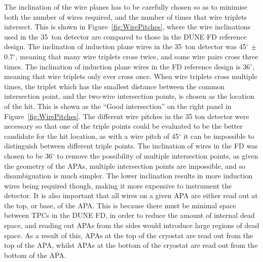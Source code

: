 The inclination of the wire planes has to be carefully chosen so as to minimise both the number of wires required, and the number of times that wire triplets intersect. This is shown in Figure~\ref{fig:WirePitches}, where the wire inclinations used in the 35~ton detector are compared to those in the DUNE FD reference design. The inclination of induction plane wires in the 35~ton detector was 45$^{\circ}$ $\pm$ 0.7$^{\circ}$, meaning that many wire triplets cross twice, and some wire pairs cross three times. The inclination of induction plane wires in the FD reference design is 36$^{\circ}$, meaning that wire triplets only ever cross once. When wire triplets cross multiple times, the triplet which has the smallest distance between the common intersection point, and the two-wire intersection points, is chosen as the location of the hit. This is shown as the ``Good intersection'' on the right panel in Figure~\ref{fig:WirePitches}. The different wire pitches in the 35 ton detector were necessary so that one of the triple points could be evaluated to be the better candidate for the hit location, as with a wire pitch of 45$^{\circ}$ it can be impossible to distinguish between different triple points. The inclination of wires in the FD was chosen to be 36$^{\circ}$ to remove the possibility of multiple intersection points, as given the geometry of the APAs, multiple intersection points are impossible, and so disambiguation is much simpler. The lower inclination results in more induction wires being required though, making it more expensive to instrument the detector. It is also important that all wires on a given APA are either read out at the top, or base, of the APA. This is because there must be minimal space between TPCs in the DUNE FD, in order to reduce the amount of internal dead space, and reading out APAs from the sides would introduce large regions of dead space. As a result of this, APAs at the top of the cryostat are read out from the top of the APA, whilst APAs at the bottom of the cryostat are read out from the bottom of the APA. \\

